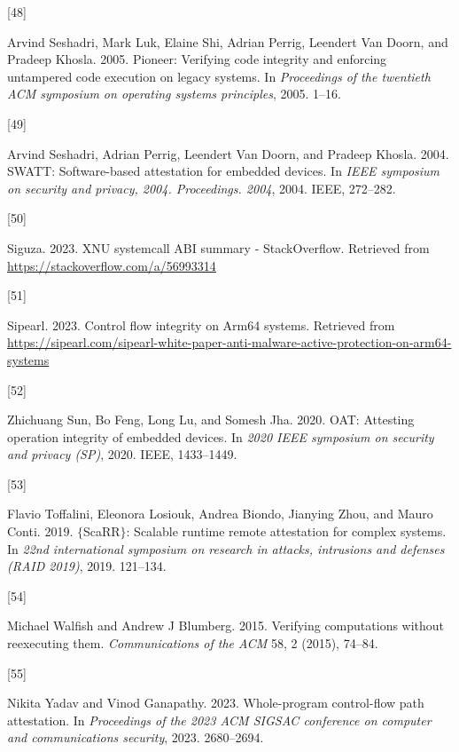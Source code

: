 \documentclass[a4paper, nobind]{templates/ociamthesis}
\newlength{\cslhangindent}
\newlength{\csllabelwidth}
\newenvironment{CSLReferences}[2] %
{\begin{list}{}{%
	\setlength{\itemindent}{0pt}
	\setlength{\leftmargin}{0pt}
	\setlength{\parsep}{0pt}
	\ifodd #1
	\setlength{\leftmargin}{\cslhangindent}
	\setlength{\itemindent}{-1\cslhangindent}
	\fi
	\setlength{\itemsep}{#2\baselineskip}}}
{\end{list}}
\newcommand{\CSLLeftMargin}[1]{\parbox[t]{\csllabelwidth}{\strut#1\strut}}
\newcommand{\CSLRightInline}[1]{\parbox[t]{\linewidth - \csllabelwidth}{\strut#1\strut}}
\begin{document}
\begin{CSLReferences}{0}{0}
\CSLLeftMargin{{[}48{]} }%
\CSLRightInline{Arvind Seshadri, Mark Luk, Elaine Shi, Adrian Perrig, Leendert Van Doorn, and Pradeep Khosla. 2005. Pioneer: Verifying code integrity and enforcing untampered code execution on legacy systems. In \emph{Proceedings of the twentieth ACM symposium on operating systems principles}, 2005. 1--16.}

\CSLLeftMargin{{[}49{]} }%
\CSLRightInline{Arvind Seshadri, Adrian Perrig, Leendert Van Doorn, and Pradeep Khosla. 2004. SWATT: Software-based attestation for embedded devices. In \emph{IEEE symposium on security and privacy, 2004. Proceedings. 2004}, 2004. IEEE, 272--282.}

\CSLLeftMargin{{[}50{]} }%
\CSLRightInline{Siguza. 2023. XNU systemcall ABI summary - StackOverflow. Retrieved from \url{https://stackoverflow.com/a/56993314}}

\CSLLeftMargin{{[}51{]} }%
\CSLRightInline{Sipearl. 2023. Control flow integrity on Arm64 systems. Retrieved from \url{https://sipearl.com/sipearl-white-paper-anti-malware-active-protection-on-arm64-systems}}

\CSLLeftMargin{{[}52{]} }%
\CSLRightInline{Zhichuang Sun, Bo Feng, Long Lu, and Somesh Jha. 2020. OAT: Attesting operation integrity of embedded devices. In \emph{2020 IEEE symposium on security and privacy (SP)}, 2020. IEEE, 1433--1449.}

\CSLLeftMargin{{[}53{]} }%
\CSLRightInline{Flavio Toffalini, Eleonora Losiouk, Andrea Biondo, Jianying Zhou, and Mauro Conti. 2019. \(\{\)ScaRR\(\}\): Scalable runtime remote attestation for complex systems. In \emph{22nd international symposium on research in attacks, intrusions and defenses (RAID 2019)}, 2019. 121--134.}

\CSLLeftMargin{{[}54{]} }%
\CSLRightInline{Michael Walfish and Andrew J Blumberg. 2015. Verifying computations without reexecuting them. \emph{Communications of the ACM} 58, 2 (2015), 74--84.}

\CSLLeftMargin{{[}55{]} }%
\CSLRightInline{Nikita Yadav and Vinod Ganapathy. 2023. Whole-program control-flow path attestation. In \emph{Proceedings of the 2023 ACM SIGSAC conference on computer and communications security}, 2023. 2680--2694.}


\end{CSLReferences}
\end{document}
